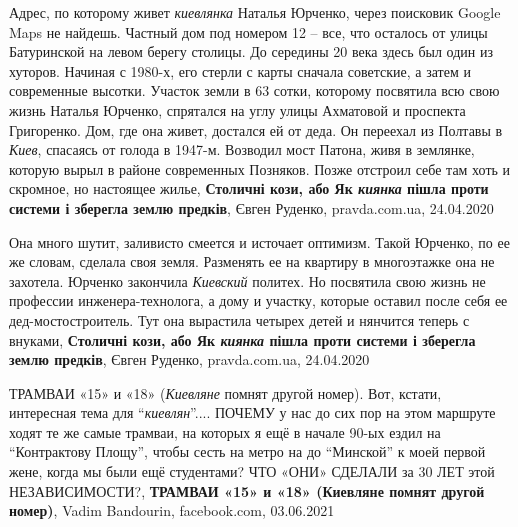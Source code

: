Адрес, по которому живет \emph{киевлянка} Наталья Юрченко, через поисковик Google Maps
не найдешь.  Частный дом под номером 12 – все, что осталось от улицы
Батуринской на левом берегу столицы.  До середины 20 века здесь был один из
хуторов. Начиная с 1980-х, его стерли с карты сначала советские, а затем и
современные высотки. Участок земли в 63 сотки, которому посвятила всю свою
жизнь Наталья Юрченко, спрятался на углу улицы Ахматовой и проспекта
Григоренко.  Дом, где она живет, достался ей от деда. Он переехал из Полтавы в
\emph{Киев}, спасаясь от голода в 1947-м. Возводил мост Патона, живя в землянке,
которую вырыл в районе современных Позняков. Позже отстроил себе там хоть и
скромное, но настоящее жилье,
\textbf{Столичні кози, або Як \emph{киянка} пішла проти системи і зберегла землю предків},
Євген Руденко, pravda.com.ua, 24.04.2020

Она много шутит, заливисто смеется и источает оптимизм. Такой Юрченко, по ее же
словам, сделала своя земля. Разменять ее на квартиру в многоэтажке она не
захотела.  Юрченко закончила \emph{Киевский} политех. Но посвятила свою жизнь
не профессии инженера-технолога, а дому и участку, которые оставил после себя
ее дед-мостостроитель. Тут она вырастила четырех детей и нянчится теперь с
внуками,
\textbf{Столичні кози, або Як \emph{киянка} пішла проти системи і зберегла землю предків},
Євген Руденко, pravda.com.ua, 24.04.2020

ТРАМВАИ «15» и «18» (\emph{Киевляне} помнят другой номер).  Вот, кстати,
интересная тема для \enquote{\emph{киевлян}}.... ПОЧЕМУ у нас до сих пор на
этом маршруте ходят те же самые трамваи, на которых я ещё в начале 90-ых ездил
на \enquote{Контрактову Площу}, чтобы сесть на метро на до \enquote{Минской} к
моей первой жене, когда мы были ещё студентами? ЧТО «ОНИ» СДЕЛАЛИ за 30 ЛЕТ
этой НЕЗАВИСИМОСТИ?,
\textbf{ТРАМВАИ «15» и «18» (Киевляне помнят другой номер)}, Vadim Bandourin, facebook.com, 03.06.2021

